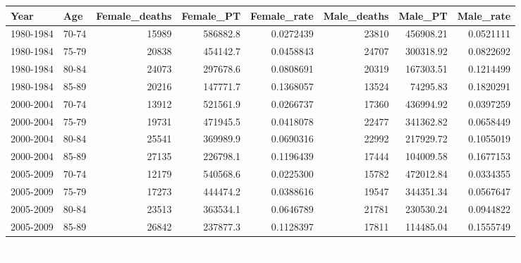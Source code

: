 \documentclass[landscape,twocolumn,letterpaper,9pt,reqno]{article}\usepackage[]{graphicx}\usepackage[]{color}
\newenvironment{knitrout}{}{} %
\begin{document}
\begin{knitrout}
\color{fgcolor}
\begin{tabular}{l|l|r|r|r|r|r|r}
\hline
Year & Age & Female\_deaths & Female\_PT & Female\_rate & Male\_deaths & Male\_PT & Male\_rate\\
\hline
1980-1984 & 70-74 & 15989 & 586882.8 & 0.0272439 & 23810 & 456908.21 & 0.0521111\\
\hline
1980-1984 & 75-79 & 20838 & 454142.7 & 0.0458843 & 24707 & 300318.92 & 0.0822692\\
\hline
1980-1984 & 80-84 & 24073 & 297678.6 & 0.0808691 & 20319 & 167303.51 & 0.1214499\\
\hline
1980-1984 & 85-89 & 20216 & 147771.7 & 0.1368057 & 13524 & 74295.83 & 0.1820291\\
\hline
2000-2004 & 70-74 & 13912 & 521561.9 & 0.0266737 & 17360 & 436994.92 & 0.0397259\\
\hline
2000-2004 & 75-79 & 19731 & 471945.5 & 0.0418078 & 22477 & 341362.82 & 0.0658449\\
\hline
2000-2004 & 80-84 & 25541 & 369989.9 & 0.0690316 & 22992 & 217929.72 & 0.1055019\\
\hline
2000-2004 & 85-89 & 27135 & 226798.1 & 0.1196439 & 17444 & 104009.58 & 0.1677153\\
\hline
2005-2009 & 70-74 & 12179 & 540568.6 & 0.0225300 & 15782 & 472012.84 & 0.0334355\\
\hline
2005-2009 & 75-79 & 17273 & 444474.2 & 0.0388616 & 19547 & 344351.34 & 0.0567647\\
\hline
2005-2009 & 80-84 & 23513 & 363534.1 & 0.0646789 & 21781 & 230530.24 & 0.0944822\\
\hline
2005-2009 & 85-89 & 26842 & 237877.3 & 0.1128397 & 17811 & 114485.04 & 0.1555749\\
\hline
\end{tabular}


\end{knitrout}

\textcolor{white}{text}\newline
\end{document}

